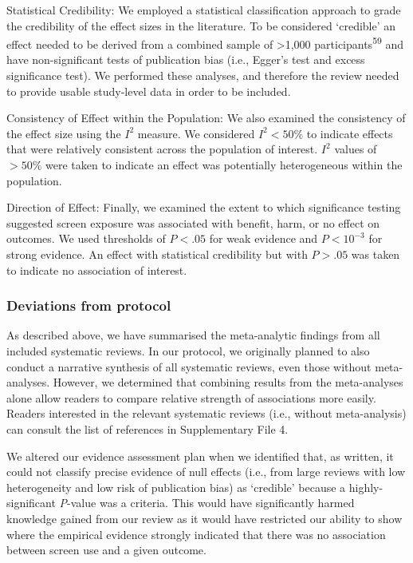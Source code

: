 \documentclass[
  english,
  man]{apa6}
\begin{document}
Statistical Credibility:
We employed a statistical classification approach to grade the credibility of the effect sizes in the literature.
To be considered `credible' an effect needed to be derived from a combined sample of \textgreater1,000 participants\textsuperscript{59} and have non-significant tests of publication bias (i.e., Egger's test and excess significance test).
We performed these analyses, and therefore the review needed to provide usable study-level data in order to be included.

Consistency of Effect within the Population:
We also examined the consistency of the effect size using the \(I^2\) measure.
We considered \(I^2 < 50\%\) to indicate effects that were relatively consistent across the population of interest.
\(I^2\) values of \(> 50\%\) were taken to indicate an effect was potentially heterogeneous within the population.

Direction of Effect:
Finally, we examined the extent to which significance testing suggested screen exposure was associated with benefit, harm, or no effect on outcomes.
We used thresholds of \(P < .05\) for weak evidence and \(P < 10^{-3}\) for strong evidence.
An effect with statistical credibility but with \(P > .05\) was taken to indicate no association of interest.

\hypertarget{deviations-from-protocol}{%
\subsubsection{Deviations from protocol}\label{deviations-from-protocol}}

As described above, we have summarised the meta-analytic findings from all included systematic reviews.
In our protocol, we originally planned to also conduct a narrative synthesis of all systematic reviews, even those without meta-analyses.
However, we determined that combining results from the meta-analyses alone allow readers to compare relative strength of associations more easily.
Readers interested in the relevant systematic reviews (i.e., without meta-analysis) can consult the list of references in Supplementary File 4.

We altered our evidence assessment plan when we identified that, as written, it could not classify precise evidence of null effects (i.e., from large reviews with low heterogeneity and low risk of publication bias) as `credible' because a highly-significant \emph{P}-value was a criteria.
This would have significantly harmed knowledge gained from our review as it would have restricted our ability to show where the empirical evidence strongly indicated that there was no association between screen use and a given outcome.
\end{document}
